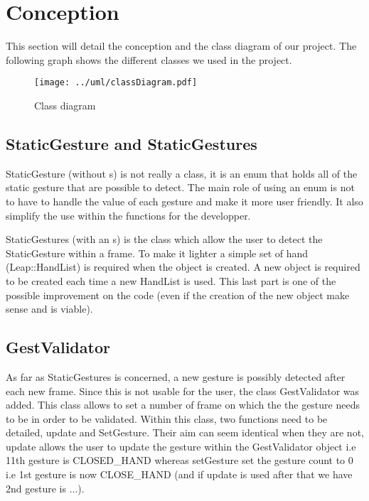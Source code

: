 \section{Conception}

This section will detail the conception and the class diagram of our project. The following graph shows the different classes we used in the project.

\begin{figure}
 \centering
 \texttt{[image: ../uml/classDiagram.pdf]}
 \caption{Class diagram}
\end{figure}

\subsection{StaticGesture and StaticGestures}

StaticGesture (without s) is not really a class, it is an enum that holds all of the static gesture that are possible to detect. The main role of using an enum is not to have to handle the value of each gesture and make it more user friendly. It also simplify the use within the functions for the developper.

StaticGestures (with an s) is the class which allow the user to detect the StaticGesture within a frame. To make it lighter a simple set of hand (Leap::HandList) is required when the object is created. A new object is required to be created each time a new HandList is used. This last part is one of the possible improvement on the code (even if the creation of the new object make sense and is viable).

\subsection{GestValidator}

As far as StaticGestures is concerned, a new gesture is possibly detected after each new frame. Since this is not usable for the user, the class GestValidator was added. This class allows to set a number of frame on which the the gesture needs to be in order to be validated.
Within this class, two functions need to be detailed, update and SetGesture. Their aim can seem identical when they are not, update allows the user to update the gesture within the GestValidator object i.e 11th gesture is CLOSED\_HAND whereas setGesture set the gesture count to 0 i.e 1st gesture is now CLOSE\_HAND (and if update is used after that we have 2nd gesture is ...).

